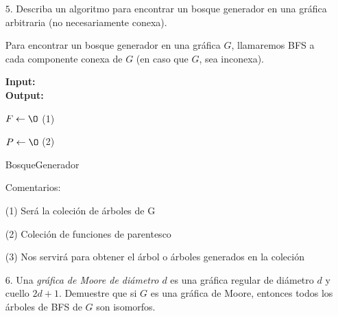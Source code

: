 \documentclass{article}
\begin{document}
\begin{enumerate}
\begin{proof}
\begin{itemize}
            Si $c_{1}$ es adyacente a $c_{2}$, entonces tenemos existe una arista $e$ tal que:
            $$e = (c_{1}, c_{2})$$
            Por lo anterior, para cualquier vértice $w \in V_{B_{1}}$ tenemos que existe un ciclo entre $c_{1}$, $c_{2}$ y $w$.

            Esto implica que $B_{C}(C)$ no es un árbol, ya que un árbol es conexo y acíclico.

            Por lo tanto, $c_{1}$ y $c_{2}$ no pueden ser adyacentes.
        \end{itemize}
      \end{proof}

    \item[$5$.] Describa un algoritmo para encontrar un bosque generador en una
      gr\'afica arbitraria (no necesariamente conexa).

        Para encontrar un bosque generador en una gráfica $G$, llamaremos BFS a cada componente conexa de $G$ (en caso que $G$, sea inconexa).

        \begin{algorithm}[H]
            \textbf{Input:} \\
            \textbf{Output:}

            $F \leftarrow \O$  (1)

            $P \leftarrow \O$  (2)

            \caption{BosqueGenerador}
        \end{algorithm}

        Comentarios:

        (1) Será la coleción de árboles de G

        (2) Coleción de funciones de parentesco

        (3) Nos servirá para obtener el árbol o árboles generados en la coleción

    \item[$6$.] Una {\em gr\'afica de Moore de di\'ametro $d$} es una gr\'afica
      regular de di\'ametro $d$ y cuello $2d+1$.   Demuestre que si $G$ es
      una gr\'afica de Moore, entonces todos los \'arboles de BFS de $G$
      son isomorfos.
  \end{enumerate}
\end{document}
